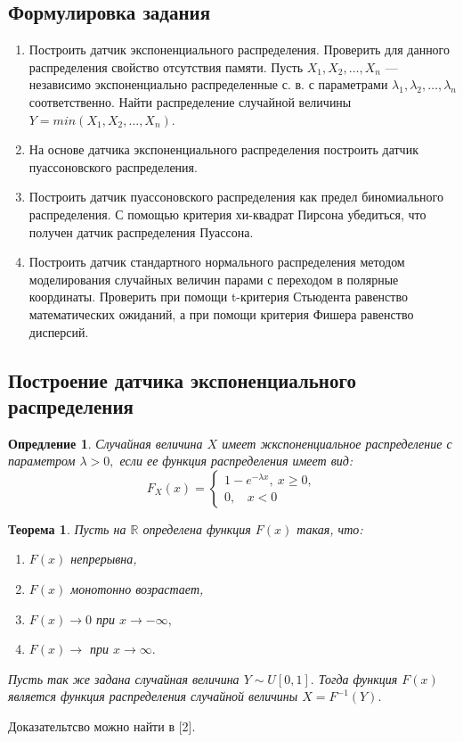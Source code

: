 \documentclass[11pt]{article}
\newtheorem{theorem}{Теорема}
\newtheorem{definition}{Опредление}
\numberwithin{equation}{section}
\begin{document}
\subsection{Формулировка задания}
\begin{enumerate}
  \item Построить датчик экспоненциального распределения. Проверить для данного распределения свойство отсутствия памяти. Пусть $X_1, X_2, \dots, X_n$ — независимо экспоненциально распределенные с. в. с параметрами $\lambda_1, \lambda_2, \dots , \lambda_n$ соответственно. Найти распределение случайной величины $Y = min(X_1, X_2, \dots, X_n)$.
  \item На основе датчика экспоненциального распределения построить датчик пуассоновского распределения.
  \item Построить датчик пуассоновского распределения как предел биномиального распределения. С помощью критерия хи-квадрат Пирсона убедиться, что получен датчик распределения Пуассона.
  \item Построить датчик стандартного нормального распределения методом моделирования случайных величин парами с переходом в полярные координаты. Проверить при помощи t-критерия Стьюдента равенство математических ожиданий, а при помощи критерия Фишера равенство дисперсий.
\end{enumerate}
\subsection{Построение датчика экспоненциального распределения}
\begin{definition}
  Случайная величина $X$ имеет жкспоненциальное распределение с параметром $\lambda > 0,$ если ее функция распределения имеет вид:
  \begin{equation}
    F_X(x) = 
    \begin{cases}
      1-e^{-\lambda x}, \ x\geq 0,\\
      0, \ \ \ \ x<0
    \end{cases}
  \end{equation}
\end{definition}

\begin{theorem}
  Пусть на $\mathbb{R}$ определена функция $F(x)$ такая, что:
  \begin{enumerate}
    \item $F(x)$ непрерывна,
    \item $F(x)$ монотонно возрастает,
    \item $F(x) \to 0$ при $x \to -\infty,$
    \item $F(x) \to $ при $x \to \infty.$  
  \end{enumerate}
  Пусть так же задана случайная величина $Y \sim U[0,1].$ Тогда функция $F(x)$ является функция распределения случайной величины $X=F^{-1}(Y).$
\end{theorem}
Доказательтсво можно найти в [2].
\end{document}
